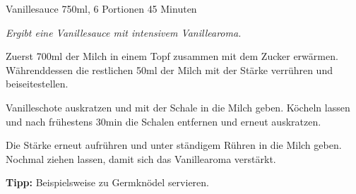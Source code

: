 \begin{recipe}{Vanillesauce} {750ml, 6 Portionen} {45 Minuten}

\freeform
\textit{Ergibt eine Vanillesauce mit intensivem Vanillearoma.}


Zuerst 700ml der Milch in einem Topf zusammen mit dem Zucker erwärmen.
Währenddessen die restlichen 50ml der Milch mit der Stärke verrühren und beiseitestellen.

\newstep
Vanilleschote auskratzen und mit der Schale in die Milch geben.
Köcheln lassen und nach frühestens 30min die Schalen entfernen und erneut auskratzen.

\newstep
Die Stärke erneut aufrühren und unter ständigem Rühren in die Milch geben.
Nochmal ziehen lassen, damit sich das Vanillearoma verstärkt.

\freeform
\hrulefill

\freeform
\textbf{Tipp:}
Beispielsweise zu Germknödel servieren.

\end{recipe}
